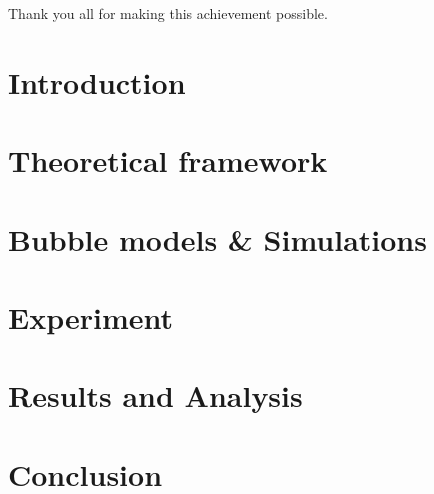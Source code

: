 \documentclass[a4paper,11pt]{report}
\begin{document}
Thank you all for making this achievement possible.

\newpage

\tableofcontents
\chapter{Introduction}


\chapter{Theoretical framework}


\chapter{Bubble models \& Simulations}


\chapter{Experiment}


\chapter{Results and Analysis}


\chapter{Conclusion}


\nocite{*}
\printbibliography[heading=bibintoc]

\begin{appendix}

\end{appendix}
\end{document}
